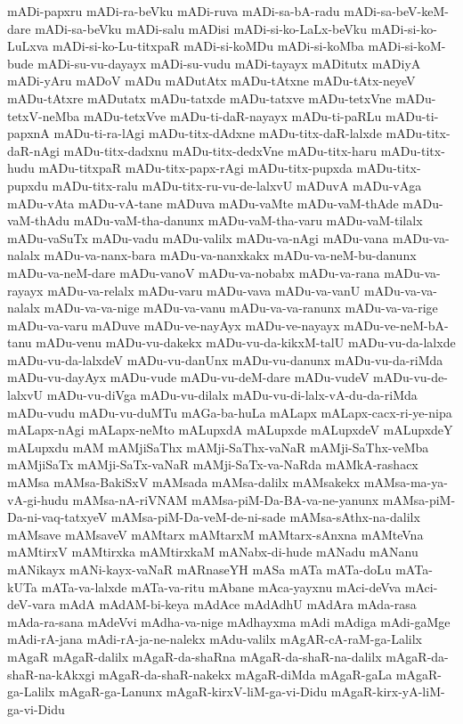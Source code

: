 {mADi-papxru
mADi-ra-beVku
mADi-ruva
mADi-sa-bA-radu
mADi-sa-beV-keM-dare
mADi-sa-beVku
mADi-salu
mADisi
mADi-si-ko-LaLx-beVku
mADi-si-ko-LuLxva
mADi-si-ko-Lu-titxpaR
mADi-si-koMDu
mADi-si-koMba
mADi-si-koM-bude
mADi-su-vu-dayayx
mADi-su-vudu
mADi-tayayx
mADitutx
mADiyA
mADi-yAru
mADoV
mADu
mADutAtx
mADu-tAtxne
mADu-tAtx-neyeV
mADu-tAtxre
mADutatx
mADu-tatxde
mADu-tatxve
mADu-tetxVne
mADu-tetxV-neMba
mADu-tetxVve
mADu-ti-daR-nayayx
mADu-ti-paRLu
mADu-ti-papxnA
mADu-ti-ra-lAgi
mADu-titx-dAdxne
mADu-titx-daR-lalxde
mADu-titx-daR-nAgi
mADu-titx-dadxnu
mADu-titx-dedxVne
mADu-titx-haru
mADu-titx-hudu
mADu-titxpaR
mADu-titx-papx-rAgi
mADu-titx-pupxda
mADu-titx-pupxdu
mADu-titx-ralu
mADu-titx-ru-vu-de-lalxvU
mADuvA
mADu-vAga
mADu-vAta
mADu-vA-tane
mADuva
mADu-vaMte
mADu-vaM-thAde
mADu-vaM-thAdu
mADu-vaM-tha-danunx
mADu-vaM-tha-varu
mADu-vaM-tilalx
mADu-vaSuTx
mADu-vadu
mADu-valilx
mADu-va-nAgi
mADu-vana
mADu-va-nalalx
mADu-va-nanx-bara
mADu-va-nanxkakx
mADu-va-neM-bu-danunx
mADu-va-neM-dare
mADu-vanoV
mADu-va-nobabx
mADu-va-rana
mADu-va-rayayx
mADu-va-relalx
mADu-varu
mADu-vava
mADu-va-vanU
mADu-va-va-nalalx
mADu-va-va-nige
mADu-va-vanu
mADu-va-va-ranunx
mADu-va-va-rige
mADu-va-varu
mADuve
mADu-ve-nayAyx
mADu-ve-nayayx
mADu-ve-neM-bA-tanu
mADu-venu
mADu-vu-dakekx
mADu-vu-da-kikxM-talU
mADu-vu-da-lalxde
mADu-vu-da-lalxdeV
mADu-vu-danUnx
mADu-vu-danunx
mADu-vu-da-riMda
mADu-vu-dayAyx
mADu-vude
mADu-vu-deM-dare
mADu-vudeV
mADu-vu-de-lalxvU
mADu-vu-diVga
mADu-vu-dilalx
mADu-vu-di-lalx-vA-du-da-riMda
mADu-vudu
mADu-vu-duMTu
mAGa-ba-huLa
mALapx
mALapx-cacx-ri-ye-nipa
mALapx-nAgi
mALapx-neMto
mALupxdA
mALupxde
mALupxdeV
mALupxdeY
mALupxdu
mAM
mAMjiSaThx
mAMji-SaThx-vaNaR
mAMji-SaThx-veMba
mAMjiSaTx
mAMji-SaTx-vaNaR
mAMji-SaTx-va-NaRda
mAMkA-rashacx
mAMsa
mAMsa-BakiSxV
mAMsada
mAMsa-dalilx
mAMsakekx
mAMsa-ma-ya-vA-gi-hudu
mAMsa-nA-riVNAM
mAMsa-piM-Da-BA-va-ne-yanunx
mAMsa-piM-Da-ni-vaq-tatxyeV
mAMsa-piM-Da-veM-de-ni-sade
mAMsa-sAthx-na-dalilx
mAMsave
mAMsaveV
mAMtarx
mAMtarxM
mAMtarx-sAnxna
mAMteVna
mAMtirxV
mAMtirxka
mAMtirxkaM
mANabx-di-hude
mANadu
mANanu
mANikayx
mANi-kayx-vaNaR
mARnaseYH
mASa
mATa
mATa-doLu
mATa-kUTa
mATa-va-lalxde
mATa-va-ritu
mAbane
mAca-yayxnu
mAci-deVva
mAci-deV-vara
mAdA
mAdAM-bi-keya
mAdAce
mAdAdhU
mAdAra
mAda-rasa
mAda-ra-sana
mAdeVvi
mAdha-va-nige
mAdhayxma
mAdi
mAdiga
mAdi-gaMge
mAdi-rA-jana
mAdi-rA-ja-ne-nalekx
mAdu-valilx
mAgAR-cA-raM-ga-Lalilx
mAgaR
mAgaR-dalilx
mAgaR-da-shaRna
mAgaR-da-shaR-na-dalilx
mAgaR-da-shaR-na-kAkxgi
mAgaR-da-shaR-nakekx
mAgaR-diMda
mAgaR-gaLa
mAgaR-ga-Lalilx
mAgaR-ga-Lanunx
mAgaR-kirxV-liM-ga-vi-Didu
mAgaR-kirx-yA-liM-ga-vi-Didu
}
